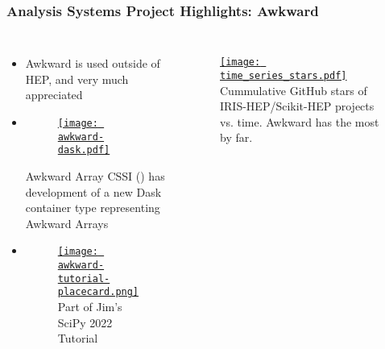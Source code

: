 \begin{frame}
  \frametitle{Analysis Systems Project Highlights: Awkward}

  \begin{columns}
    \begin{itemize}\setlength{\itemsep}{0.1 cm}
      \item Awkward is used outside of HEP, and very much appreciated
      \item \begin{figure}
        \begin{center}
            \href{https://iris-hep.org/projects/awkward-dask.html}{\texttt{[image: awkward-dask.pdf]}}
        \end{center}
    \end{figure}
   Awkward Array CSSI () has development of a new Dask container type representing Awkward Arrays
      \item
      \begin{figure}
        \begin{center}
            \href{https://github.com/jpivarski-talks/2022-07-11-scipy-loopy-tutorial}{\texttt{[image: awkward-tutorial-placecard.png]}}
            Part of Jim's SciPy 2022 Tutorial
        \end{center}
      \end{figure}
    \end{itemize}
%
    \begin{figure}
        \begin{center}
            \href{https://iris-hep.org/analysis-community-summary/\#stars}{\texttt{[image: time\_series\_stars.pdf]}}
            Cummulative GitHub stars of IRIS-HEP/Scikit-HEP projects vs. time. Awkward has the most by far.
        \end{center}
    \end{figure}
  \end{columns}

\end{frame}

